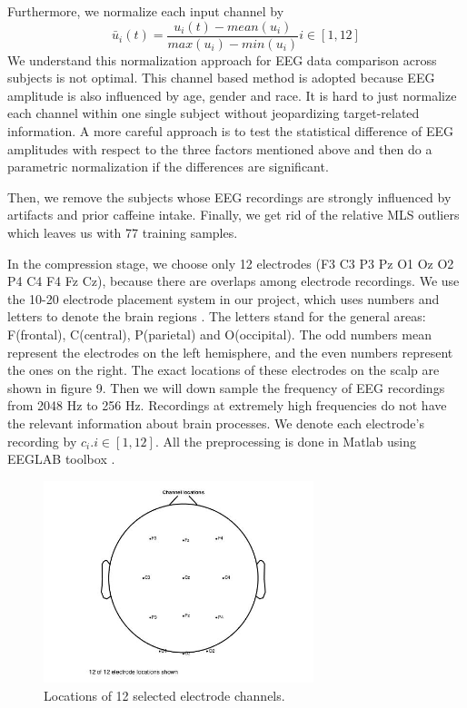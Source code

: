 \documentclass[a4paper,11pt,oneside]{article}
\begin{document}
	Furthermore, we normalize each input channel by 
	$$ \bar{u}_i(t) = \frac{u_i(t) - mean(u_i)}{max(u_i) - min(u_i)} i \in [1, 12] $$
	We understand this normalization approach for EEG data comparison across subjects is not optimal. This channel based method is adopted because EEG amplitude is also influenced by age, gender and race. It is hard to just normalize each channel within one single subject without jeopardizing target-related information. A more careful approach is to test the statistical difference of EEG amplitudes with respect to the three factors mentioned above and then do a parametric normalization if the differences are significant.  
	
	Then, we remove the subjects whose EEG recordings are strongly influenced by artifacts and prior caffeine intake. Finally, we get rid of the relative MLS outliers which leaves us with 77 training samples.
		
	In the compression stage, we choose only 12 electrodes (F3 C3 P3 Pz O1 Oz O2 P4 C4 F4 Fz Cz), because  there are overlaps among electrode recordings. We use the 10-20 electrode placement system in our project, which uses numbers and letters to denote the brain regions \cite{klem1999ten}. The letters stand for the general areas: F(frontal), C(central), P(parietal) and O(occipital). The odd numbers mean represent the electrodes on the left hemisphere, and the even numbers represent the ones on the right. The exact locations of these electrodes on the scalp are shown in figure 9. Then we will down sample the frequency of EEG recordings from 2048 Hz to 256 Hz. Recordings at extremely high frequencies do not have the relevant information about brain processes. We denote each electrode's recording by $c_i. i \in [1, 12]$. 
	All the preprocessing is done in Matlab using EEGLAB toolbox \cite{delorme2004eeglab}.
	
	\begin{figure}[!h]
		\begin{center}
			\includegraphics[width=0.7\textwidth]{img/chanLocation}
		\end{center}
		\caption{Locations of 12 selected electrode channels.}
	\end{figure}
\end{document}
